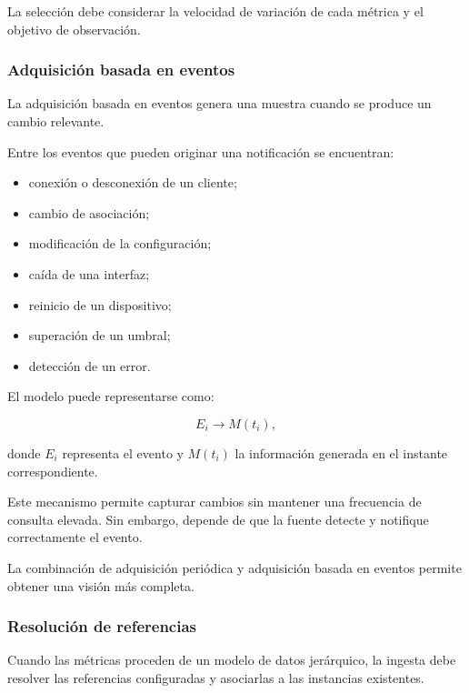 La selección debe considerar la velocidad de variación de cada métrica y
el objetivo de observación.


\subsubsection*{Adquisición basada en eventos}

La adquisición basada en eventos genera una muestra cuando se produce un
cambio relevante.

Entre los eventos que pueden originar una notificación se encuentran:

\begin{itemize}
    \item conexión o desconexión de un cliente;

    \item cambio de asociación;

    \item modificación de la configuración;

    \item caída de una interfaz;

    \item reinicio de un dispositivo;

    \item superación de un umbral;

    \item detección de un error.
\end{itemize}

El modelo puede representarse como:

\[
    E_i
    \longrightarrow
    M(t_i),
\]

donde \(E_i\) representa el evento y \(M(t_i)\) la información generada
en el instante correspondiente.

Este mecanismo permite capturar cambios sin mantener una frecuencia de
consulta elevada. Sin embargo, depende de que la fuente detecte y
notifique correctamente el evento.

La combinación de adquisición periódica y adquisición basada en eventos
permite obtener una visión más completa.


\subsubsection*{Resolución de referencias}

Cuando las métricas proceden de un modelo de datos jerárquico, la ingesta
debe resolver las referencias configuradas y asociarlas a las instancias
existentes.

